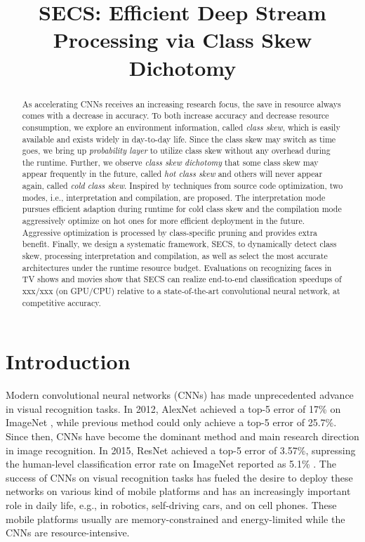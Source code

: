 \documentclass[pageno]{jpaper}
\begin{document}
\title{SECS: Efficient Deep Stream Processing via Class Skew Dichotomy}
\author{}
\date{}
\maketitle

\thispagestyle{empty}

\begin{abstract}
As accelerating CNNs receives an increasing research focus, the save in resource always comes with a decrease in accuracy. To both increase accuracy and decrease resource consumption, we explore an environment information, called \textit{class skew}, which is easily available and exists widely in day-to-day life. Since the class skew may switch as time goes, we bring up \textit{probability layer} to utilize class skew without any overhead during the runtime. Further, we observe \textit{class skew dichotomy} that some class skew may appear frequently in the future, called \textit{hot class skew} and others will never appear again, called \textit{cold class skew}. Inspired by techniques from source code optimization, two modes, i.e., interpretation and compilation, are proposed. The interpretation mode pursues efficient adaption during runtime for cold class skew and the compilation mode aggressively optimize on hot ones for more efficient deployment in the future. Aggressive optimization is processed by class-specific pruning and provides extra benefit. Finally, we design a systematic framework, SECS, to dynamically detect class skew, processing interpretation and compilation, as well as select the most accurate architectures under the runtime resource budget. Evaluations on recognizing faces in TV shows and movies show that SECS can realize end-to-end classification speedups of xxx/xxx (on GPU/CPU) relative to a state-of-the-art convolutional neural network, at competitive accuracy.
\end{abstract}




\section{Introduction} \label{Introduction}

Modern convolutional neural networks (CNNs) has made unprecedented advance in visual recognition tasks. In 2012, AlexNet \cite{krizhevsky2012imagenet} achieved a top-5 error of 17\% on ImageNet \cite{deng2009imagenet}, while previous method could only achieve a top-5 error of 25.7\%. Since then, CNNs have become the dominant method and main research direction in image recognition. In 2015, ResNet \cite{he2016deep} achieved a top-5 error of 3.57\%, supressing the human-level classification error rate on ImageNet reported as 5.1\% \cite{russakovsky2015imagenet}. The success of CNNs on visual recognition tasks has fueled the desire to deploy these networks on various kind of mobile platforms and has an increasingly important role in daily life, e.g., in robotics, self-driving cars, and on cell phones. These mobile platforms usually are memory-constrained and energy-limited while the CNNs are resource-intensive.
\end{document}
